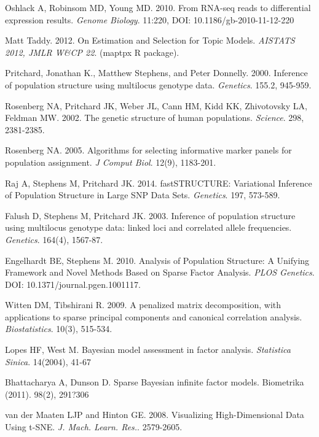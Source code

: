 \documentclass[10pt,letterpaper]{article}
\begin{document}
\begin{thebibliography}{9}
Oshlack A, Robinsom MD, Young MD. 2010.
From RNA-seq reads to differential expression results.
\textit{Genome Biology}. 11:220, DOI: 10.1186/gb-2010-11-12-220

Matt Taddy. 2012.
On Estimation and Selection for Topic Models.
\textit{AISTATS 2012, JMLR W\&CP 22}.
(maptpx R package).

Pritchard, Jonathan K., Matthew Stephens, and Peter Donnelly. 2000.
Inference of population structure using multilocus genotype data.
\textit{Genetics}. 155.2,  945-959.

Rosenberg NA, Pritchard JK,  Weber JL, Cann HM,  Kidd KK,  Zhivotovsky LA,  Feldman MW. 2002.
The genetic structure of human populations.
\textit{Science}. 298,  2381-2385.

Rosenberg NA. 2005.
Algorithms for selecting informative marker panels for population assignment.
\textit{J Comput Biol}. 12(9), 1183-201.

Raj A,  Stephens M,  Pritchard JK.  2014.
fastSTRUCTURE: Variational Inference of Population Structure in Large SNP Data Sets.
\textit{Genetics}. 197,  573-589.

Falush D,  Stephens M,  Pritchard JK. 2003.
Inference of population structure using multilocus genotype data: linked loci and correlated allele frequencies.
\textit{Genetics}. 164(4), 1567-87.

Engelhardt BE,  Stephens M. 2010.
Analysis of Population Structure: A Unifying Framework and Novel Methods Based on Sparse Factor Analysis.
\textit{PLOS Genetics}. DOI: 10.1371/journal.pgen.1001117.

Witten DM, Tibshirani R. 2009.
A penalized matrix decomposition, with applications to sparse principal components and canonical correlation analysis.
\textit{Biostatistics}. 10(3), 515-534.

Lopes HF, West M.
Bayesian model assessment in factor analysis.
\textit{Statistica Sinica}. 14(2004), 41-67

Bhattacharya A, Dunson D.
Sparse Bayesian infinite factor models.
Biometrika (2011). 98(2),  291?306


van der Maaten LJP and  Hinton GE. 2008.
Visualizing High-Dimensional Data Using t-SNE.
\textit{J. Mach. Learn. Res.}.  2579-2605.


\end{thebibliography}
\end{document}
